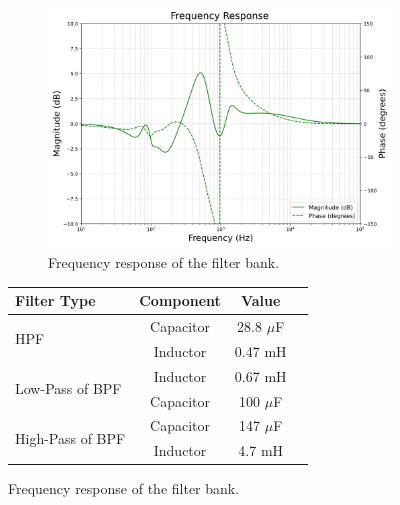 \begin{figure}[H]
    \centering
        \begin{minipage}{0.48\textwidth}
            \begin{figure}[H]
            \centering
            \captionsetup{justification=raggedright, labelfont=}
                \includegraphics[width=0.9\linewidth]{TU Delft Booming Bass Project Report//figures//FilterGroup/Frequency response.png}
            \caption{Frequency response of the filter bank.}
            \label{fig:freq_resp}
            \end{figure}
        \end{minipage}
        \hfill %
        \begin{minipage}{0.50\textwidth}
        \captionsetup{justification=raggedright, labelfont=bf}
            \centering
            \begin{tabular}{@{}lccc@{}}
            \toprule
    \textbf{Filter Type}     & \textbf{Component} & \textbf{Value} \\ \midrule
    \multirow{2}{*}{HPF} 
                             & Capacitor                & 28.8 $\mu$F      \\
                             & Inductor                & 0.47 mH        \\ \midrule
    \multirow{2}{*}{Low-Pass of BPF}
                            & Inductor              & 0.67 mH \\
                            & Capacitor             & 100 $\mu$F \\
                            \midrule
    \multirow{2}{*}{High-Pass of BPF}
                            & Capacitor              & 147 $\mu$F \\
                            & Inductor             & 4.7 mH \\
                            \midrule
    

\end{tabular}
\end{minipage}
\end{figure}
